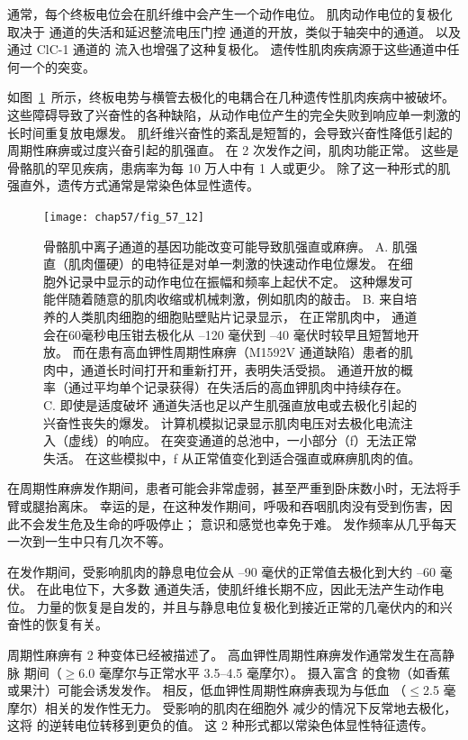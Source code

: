 通常，每个终板电位会在肌纤维中会产生一个动作电位。
肌肉动作电位的复极化取决于  通道的失活和延迟整流电压门控  通道的开放，类似于轴突中的通道。
以及通过 ClC-1  通道的  流入也增强了这种复极化。
遗传性肌肉疾病源于这些通道中任何一个的突变。


如图~\ref{fig:57_12}~所示，终板电势与横管去极化的电耦合在几种遗传性肌肉疾病中被破坏。
这些障碍导致了兴奋性的各种缺陷，从动作电位产生的完全失败到响应单一刺激的长时间重复放电爆发。
肌纤维兴奋性的紊乱是短暂的，会导致兴奋性降低引起的周期性麻痹或过度兴奋引起的肌强直。
在 2 次发作之间，肌肉功能正常。
这些是骨骼肌的罕见疾病，患病率为每 10 万人中有 1 人或更少。
除了这一种形式的肌强直外，遗传方式通常是常染色体显性遗传。


\begin{figure}[htbp]
	\centering
	\texttt{[image: chap57/fig\_57\_12]}
	\caption{骨骼肌中离子通道的基因功能改变可能导致肌强直或麻痹。
		A. 肌强直（肌肉僵硬）的电特征是对单一刺激的快速动作电位爆发。
		在细胞外记录中显示的动作电位在振幅和频率上起伏不定。
		这种爆发可能伴随着随意的肌肉收缩或机械刺激，例如肌肉的敲击。
		B. 来自培养的人类肌肉细胞的细胞贴壁贴片记录显示，
		在正常肌肉中， 通道会在60毫秒电压钳去极化从 –120 毫伏到 –40 毫伏时较早且短暂地开放。
		而在患有高血钾性周期性麻痹（M1592V  通道缺陷）患者的肌肉中，通道长时间打开和重新打开，表明失活受损。
		通道开放的概率（通过平均单个记录获得）在失活后的高血钾肌肉中持续存在。
		C. 即使是适度破坏  通道失活也足以产生肌强直放电或去极化引起的兴奋性丧失的爆发。
		计算机模拟记录显示肌肉电压对去极化电流注入（虚线）的响应。
		在突变通道的总池中，一小部分（f）无法正常失活。
		在这些模拟中，f 从正常值变化到适合强直或麻痹肌肉的值。}
	\label{fig:57_12}
\end{figure}


在周期性麻痹发作期间，患者可能会非常虚弱，甚至严重到卧床数小时，无法将手臂或腿抬离床。
幸运的是，在这种发作期间，呼吸和吞咽肌肉没有受到伤害，因此不会发生危及生命的呼吸停止；
意识和感觉也幸免于难。
发作频率从几乎每天一次到一生中只有几次不等。


在发作期间，受影响肌肉的静息电位会从 –90 毫伏的正常值去极化到大约 –60 毫伏。
在此电位下，大多数  通道失活，使肌纤维长期不应，因此无法产生动作电位。
力量的恢复是自发的，并且与静息电位复极化到接近正常的几毫伏内的和兴奋性的恢复有关。


周期性麻痹有 2 种变体已经被描述了。
高血钾性周期性麻痹发作通常发生在高静脉  期间（$\geq$6.0 毫摩尔与正常水平 3.5–4.5 毫摩尔）。
摄入富含  的食物（如香蕉或果汁）可能会诱发发作。
相反，低血钾性周期性麻痹表现为与低血 （$\leq$2.5 毫摩尔）相关的发作性无力。
受影响的肌肉在细胞外  减少的情况下反常地去极化，这将  的逆转电位转移到更负的值。
这 2 种形式都以常染色体显性特征遗传。


